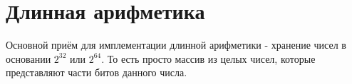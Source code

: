 
\section{Длинная арифметика}
Основной приём для имплементации длинной арифметики - хранение чисел в основании $2^{32}$ или $2^{64}$. То есть просто массив из целых чисел, которые представляют части битов данного числа. 
